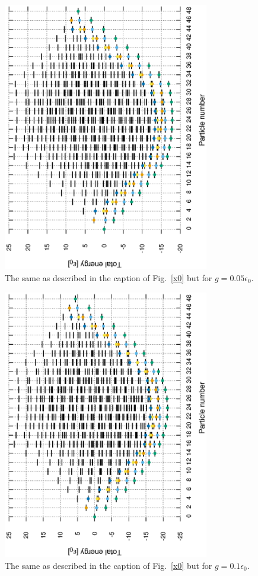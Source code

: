 \documentclass[11pt]{book} %
\begin{document}
\begin{figure}[htbp]
 \begin{center}
  \includegraphics[width=90mm,angle=-90]{images/spectra_g0p05.eps}
 \end{center}
 \caption{The same as described in the caption of Fig.~\ref{x0} but for $g=0.05\epsilon_0$.
	}
 \label{g0p05}
\end{figure}

\begin{figure}[htbp]
 \begin{center}
  \includegraphics[width=90mm,angle=-90]{images/spectra_g0p1.eps}
 \end{center}
 \caption{The same as described in the caption of Fig.~\ref{x0} but for $g=0.1\epsilon_0$.
	}
 \label{g0p1}
\end{figure}
\end{document}
